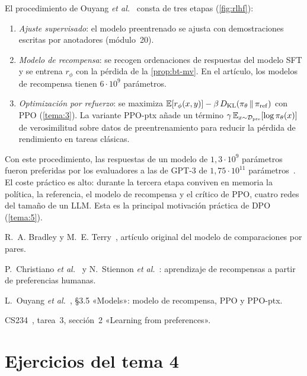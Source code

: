 El procedimiento de Ouyang \emph{et al.}~\cite[§3.5]{instructgpt} consta de tres etapas (\cref{fig:rlhf}):
\begin{enumerate}[label=\arabic*.]
  \item \emph{Ajuste supervisado}: el modelo preentrenado se ajusta con demostraciones escritas por anotadores (módulo~20).
  \item \emph{Modelo de recompensa}: se recogen ordenaciones de respuestas del modelo SFT y se entrena $r_\phi$ con la pérdida de la \cref{prop:bt-mv}. En el artículo, los modelos de recompensa tienen $6\cdot 10^{9}$ parámetros.
  \item \emph{Optimización por refuerzo}: se maximiza $\mathbb{E}[r_\phi(x,y)]-\beta\,D_{\mathrm{KL}}(\pi_\theta\,\|\,\pi_{\mathrm{ref}})$ con PPO (\cref{tema:3}). La variante PPO-ptx añade un término $\gamma\,\mathbb{E}_{x\sim\mathcal{D}_{\mathrm{pre}}}[\log\pi_\theta(x)]$ de verosimilitud sobre datos de preentrenamiento para reducir la pérdida de rendimiento en tareas clásicas.
\end{enumerate}

Con este procedimiento, las respuestas de un modelo de $1{,}3\cdot 10^{9}$ parámetros fueron preferidas por los evaluadores a las de GPT-3 de $1{,}75\cdot 10^{11}$ parámetros~\cite{instructgpt}. El coste práctico es alto: durante la tercera etapa conviven en memoria la política, la referencia, el modelo de recompensa y el crítico de PPO, cuatro redes del tamaño de un LLM. Esta es la principal motivación práctica de DPO (\cref{tema:5}).

\begin{lecturas}
\item R.~A. Bradley y M.~E. Terry~\cite{bt}, artículo original del modelo de comparaciones por pares.
\item P.~Christiano \emph{et al.}~\cite{christiano} y N.~Stiennon \emph{et al.}~\cite{stiennon}: aprendizaje de recompensas a partir de preferencias humanas.
\item L.~Ouyang \emph{et al.}~\cite{instructgpt}, §3.5 «Models»: modelo de recompensa, PPO y PPO-ptx.
\item CS234~\cite{cs234a3}, tarea~3, sección~2 «Learning from preferences».
\end{lecturas}

\section*{Ejercicios del tema 4}


